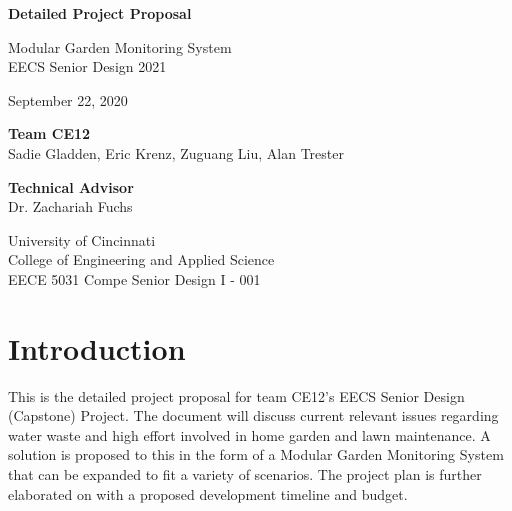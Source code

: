 \documentclass[]{article}
\begin{document}
\begin{titlepage}
    \begin{center}
        \vspace*{1cm}

        \Huge
        \textbf{Detailed Project Proposal}

        \vspace{1.5cm}
        \Large
        Modular Garden Monitoring System\\
        EECS Senior Design 2021

        \vspace{0.5cm}
        September 22, 2020

        \vspace{1.5cm}

        \textbf{Team CE12} \\
        {\Large Sadie Gladden, Eric Krenz, Zuguang Liu, Alan Trester}

        \vspace{1.5cm}
        \textbf{Technical Advisor} \\
        {\Large Dr. Zachariah Fuchs}

        \vfill

        University of Cincinnati\\
        College of Engineering and Applied Science\\
        EECE 5031 Compe Senior Design I - 001

        \vspace{0.8cm}
    \end{center}
\end{titlepage}





\section*{Introduction}

This is the detailed project proposal for team CE12's EECS Senior Design (Capstone) Project. The document will discuss current relevant issues regarding water waste and high effort involved in home garden and lawn maintenance. A solution is proposed to this in the form of a Modular Garden Monitoring System that can be expanded to fit a variety of scenarios. The project plan is further elaborated on with a proposed development timeline and budget.\\
\end{document}
